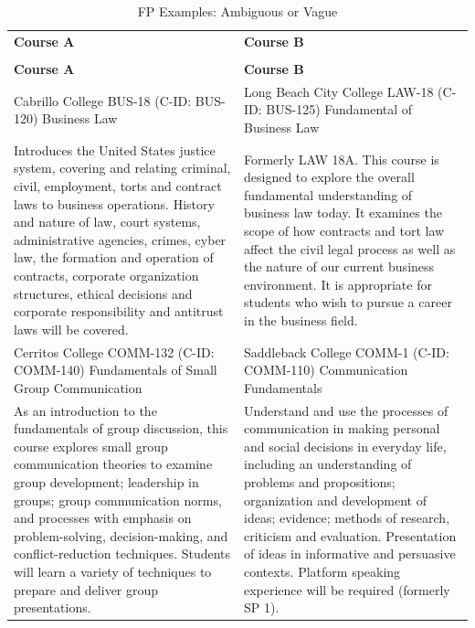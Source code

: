 {
\renewcommand{\arraystretch}{0.5}    
\begin{longtable}{ >{\baselineskip=12pt}p{}  >{\baselineskip=12pt}p{} }
\captionsetup{skip=5pt}
\caption{FP Examples: Ambiguous or Vague}\label{tab:fp_vague}\\
\bottomrule\toprule
\textbf{Course A} & \textbf{Course B} \\
\bottomrule\toprule
\endfirsthead
\caption[]{FP Examples: Ambiguous or Vague}\\
\bottomrule\toprule
\textbf{Course A} & \textbf{Course B} \\
\bottomrule\toprule
\endhead
Cabrillo College \newline BUS-18 (C-ID: BUS-120) \newline Business Law & Long Beach City College \newline LAW-18 (C-ID: BUS-125) \newline Fundamental of Business Law \\
\midrule
Introduces the United States justice system, covering and relating criminal, civil, employment, torts and contract laws to business operations. History and nature of law, court systems, administrative agencies, crimes, cyber law, the formation and operation of contracts, corporate organization structures, ethical decisions and corporate responsibility and antitrust laws will be covered. & Formerly LAW 18A. This course is designed to explore the overall fundamental understanding of business law today. It examines the scope of how contracts and tort law affect the civil legal process as well as the nature of our current business environment. It is appropriate for students who wish to pursue a career in the business field. \\
\bottomrule\toprule
Cerritos College \newline COMM-132 (C-ID: COMM-140) \newline Fundamentals of Small Group Communication & Saddleback College \newline COMM-1 (C-ID: COMM-110) \newline Communication Fundamentals \\
\midrule
As an introduction to the fundamentals of group discussion, this course explores small group communication theories to examine group development; leadership in groups; group communication norms, and processes with emphasis on problem-solving, decision-making, and conflict-reduction techniques. Students will learn a variety of techniques to prepare and deliver group presentations. & Understand and use the processes of communication in making personal and social decisions in everyday life, including an understanding of problems and propositions; organization and development of ideas; evidence; methods of research, criticism and evaluation. Presentation of ideas in informative and persuasive contexts. Platform speaking experience will be required (formerly SP 1). \\
\bottomrule\toprule
\end{longtable}
}

